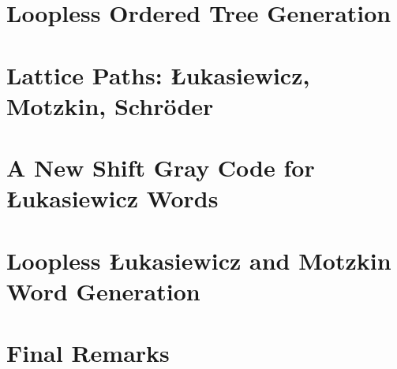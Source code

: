 \chapter{Loopless Ordered Tree Generation} \label{chap:otree-implementation}



\chapter{Lattice Paths: Łukasiewicz, Motzkin, Schröder}
 \label{chap:luka-background}

\chapter{A New Shift Gray Code for Łukasiewicz Words} \label{chap:luka-graycode}

\chapter{Loopless Łukasiewicz and Motzkin Word Generation} \label{chap:luka-implementation}


\chapter{Final Remarks}






